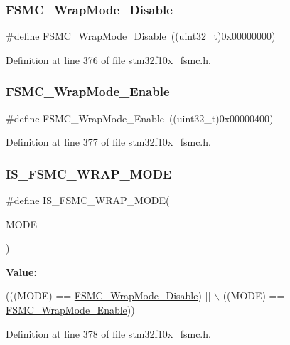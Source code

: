 \subsubsection{\texorpdfstring{F\+S\+M\+C\+\_\+\+Wrap\+Mode\+\_\+\+Disable}{FSMC\_WrapMode\_Disable}}
{\footnotesize\ttfamily \#define F\+S\+M\+C\+\_\+\+Wrap\+Mode\+\_\+\+Disable~((uint32\+\_\+t)0x00000000)}



Definition at line 376 of file stm32f10x\+\_\+fsmc.\+h.

\mbox{\label{group___f_s_m_c___wrap___mode_gad07eb0ae0362b2f94071d0dab6473fda}} 
\subsubsection{\texorpdfstring{F\+S\+M\+C\+\_\+\+Wrap\+Mode\+\_\+\+Enable}{FSMC\_WrapMode\_Enable}}
{\footnotesize\ttfamily \#define F\+S\+M\+C\+\_\+\+Wrap\+Mode\+\_\+\+Enable~((uint32\+\_\+t)0x00000400)}



Definition at line 377 of file stm32f10x\+\_\+fsmc.\+h.

\mbox{\label{group___f_s_m_c___wrap___mode_ga0751d74b7fb1e17f6cedea091e8ebfc8}} 
\subsubsection{\texorpdfstring{I\+S\+\_\+\+F\+S\+M\+C\+\_\+\+W\+R\+A\+P\+\_\+\+M\+O\+DE}{IS\_FSMC\_WRAP\_MODE}}
{\footnotesize\ttfamily \#define I\+S\+\_\+\+F\+S\+M\+C\+\_\+\+W\+R\+A\+P\+\_\+\+M\+O\+DE(\begin{DoxyParamCaption}\item[{}]{M\+O\+DE }\end{DoxyParamCaption})}

{\bfseries Value\+:}
\begin{DoxyCode}
(((MODE) == \hyperlink{group___f_s_m_c___wrap___mode_ga6041f0d3055ea3811a5a19560092f266}{FSMC\_WrapMode\_Disable}) || \(\backslash\)
                                 ((MODE) == \hyperlink{group___f_s_m_c___wrap___mode_gad07eb0ae0362b2f94071d0dab6473fda}{FSMC\_WrapMode\_Enable}))
\end{DoxyCode}


Definition at line 378 of file stm32f10x\+\_\+fsmc.\+h.

